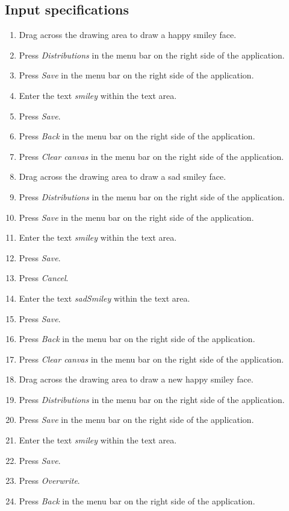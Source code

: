 \subsection*{Input specifications}
\begin{enumerate}
\item Drag across the drawing area to draw a happy smiley face.
\item Press \emph{Distributions} in the menu bar on the right side of the application.
\item Press \emph{Save} in the menu bar on the right side of the application.
\item Enter the text \emph{smiley} within the text area.
\item Press \emph{Save}.

\item Press \emph{Back} in the menu bar on the right side of the application.
\item Press \emph{Clear canvas} in the menu bar on the right side of the application. 
\item Drag across the drawing area to draw a sad smiley face.
\item Press \emph{Distributions} in the menu bar on the right side of the application.
\item Press \emph{Save} in the menu bar on the right side of the application.

\item Enter the text \emph{smiley} within the text area.
\item Press \emph{Save}.
\item Press \emph{Cancel}.
\item Enter the text \emph{sadSmiley} within the text area.
\item Press \emph{Save}.

\item Press \emph{Back} in the menu bar on the right side of the application.
\item Press \emph{Clear canvas} in the menu bar on the right side of the application.
\item Drag across the drawing area to draw a new happy smiley face.
\item Press \emph{Distributions} in the menu bar on the right side of the application.
\item Press \emph{Save} in the menu bar on the right side of the application.

\item Enter the text \emph{smiley} within the text area.
\item Press \emph{Save}.
\item Press \emph{Overwrite}.
\item Press \emph{Back} in the menu bar on the right side of the application.
\end{enumerate}

